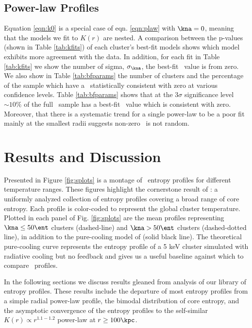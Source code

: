 \documentclass{emulateapj}
\begin{document}
\subsection{Power-law Profiles}
\label{sec:quality}

Equation \ref{eqn:k0} is a special case of eqn. \ref{eqn:plaw} with
$\kna = 0$, meaning that the models we fit to $K(r)$ are nested. A
comparison between the p-values (shown in Table \ref{tab:kfits}) of
each cluster's best-fit models shows which model exhibits more
agreement with the data. In addition, for each fit in Table
\ref{tab:kfits} we show the number of sigma, $\sigma_{\kna}$, the
best-fit \kna\ value is from zero. We also show in Table
\ref{tab:bfparams} the number of clusters and the percentage of the
sample which have a \kna\ statistically consistent with zero at
various confidence levels. Table \ref{tab:bfparams} shows that at the
$3\sigma$ significance level $\sim10\%$ of the full \accept\ sample
has a best-fit \kna\ value which is consistent with zero. Moreover,
that there is a systematic trend for a single power-law to be a poor
fit mainly at the smallest radii suggests non-zero \kna\ is not
random.

\section{Results and Discussion}
\label{sec:r&d}

Presented in Figure \ref{fig:splots} is a montage of \accept\ entropy
profiles for different temperature ranges. These figures highlight the
cornerstone result of \accept: a uniformly analyzed collection of
entropy profiles covering a broad range of core entropy. Each profile
is color-coded to represent the global cluster temperature. Plotted in
each panel of Fig. \ref{fig:splots} are the mean profiles representing
$\kna \le 50 \ent$ clusters (dashed-line) and $\kna > 50 \ent$
clusters (dashed-dotted line), in addition to the pure-cooling model
of \citet{voitbryan} (solid black line). The theoretical pure-cooling
curve represents the entropy profile of a 5 keV cluster simulated with
radiative cooling but no feedback and gives us a useful baseline
against which to compare \accept\ profiles.

In the following sections we discuss results gleaned from analysis of
our library of entropy profiles. These results include the departure
of most entropy profiles from a simple radial power-law profile, the
bimodal distribution of core entropy, and the asymptotic convergence
of the entropy profiles to the self-similar $K(r) \propto r^{1.1-1.2}$
power-law at $r \geq 100\kpc$.
\end{document}
